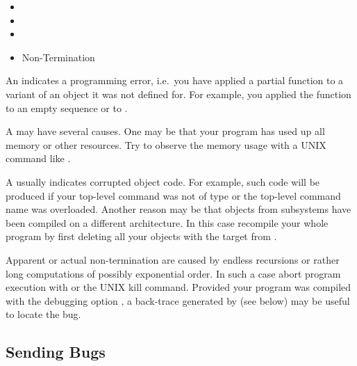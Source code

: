 \begin{itemize}
\item {}
\item {}
\item {}
\item Non-Termination
\end{itemize}

An \opal{}   indicates a programming error, i.e.\ you have
applied a 
partial function to a variant of an object it was not defined for. For
example, you applied the function  to an empty sequence or
 to .

A  may have several causes. One may be that
your program has used up all memory or other resources. Try to observe the
memory usage with a UNIX command like .

A  usually indicates corrupted object code. For example, such
code will be 
produced if your top-level command was not of type 
or the top-level command name was overloaded. Another reason may be that
objects from subsystems have been compiled on a different architecture. In
this case recompile your whole program by first deleting all your objects
with the  target from .

Apparent or actual non-termination are caused by endless recursions or rather
long computations of possibly exponential order. In such a case abort program
execution with  or the UNIX kill command. Provided your program
was compiled with the debugging option , a back-trace generated by
 (see below) may be useful to locate the bug.

\subsection{Sending Bugs}

